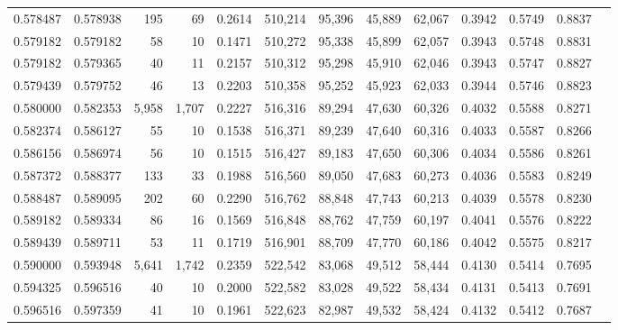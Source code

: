 \begin{tabular}{rrrrrrrrrrrrr}
0.578487 & 0.578938 &    195 &    69 &                                     0.2614 & 510,214 &  95,396 &  45,889 &  62,067 & 0.3942 & 0.5749 & 0.8837 \\
0.579182 & 0.579182 &     58 &    10 &                                     0.1471 & 510,272 &  95,338 &  45,899 &  62,057 & 0.3943 & 0.5748 & 0.8831 \\
0.579182 & 0.579365 &     40 &    11 &                                     0.2157 & 510,312 &  95,298 &  45,910 &  62,046 & 0.3943 & 0.5747 & 0.8827 \\
0.579439 & 0.579752 &     46 &    13 &                                     0.2203 & 510,358 &  95,252 &  45,923 &  62,033 & 0.3944 & 0.5746 & 0.8823 \\
0.580000 & 0.582353 &  5,958 & 1,707 &                                     0.2227 & 516,316 &  89,294 &  47,630 &  60,326 & 0.4032 & 0.5588 & 0.8271 \\
0.582374 & 0.586127 &     55 &    10 &                                     0.1538 & 516,371 &  89,239 &  47,640 &  60,316 & 0.4033 & 0.5587 & 0.8266 \\
0.586156 & 0.586974 &     56 &    10 &                                     0.1515 & 516,427 &  89,183 &  47,650 &  60,306 & 0.4034 & 0.5586 & 0.8261 \\
0.587372 & 0.588377 &    133 &    33 &                                     0.1988 & 516,560 &  89,050 &  47,683 &  60,273 & 0.4036 & 0.5583 & 0.8249 \\
0.588487 & 0.589095 &    202 &    60 &                                     0.2290 & 516,762 &  88,848 &  47,743 &  60,213 & 0.4039 & 0.5578 & 0.8230 \\
0.589182 & 0.589334 &     86 &    16 &                                     0.1569 & 516,848 &  88,762 &  47,759 &  60,197 & 0.4041 & 0.5576 & 0.8222 \\
0.589439 & 0.589711 &     53 &    11 &                                     0.1719 & 516,901 &  88,709 &  47,770 &  60,186 & 0.4042 & 0.5575 & 0.8217 \\
0.590000 & 0.593948 &  5,641 & 1,742 &                                     0.2359 & 522,542 &  83,068 &  49,512 &  58,444 & 0.4130 & 0.5414 & 0.7695 \\
0.594325 & 0.596516 &     40 &    10 &                                     0.2000 & 522,582 &  83,028 &  49,522 &  58,434 & 0.4131 & 0.5413 & 0.7691 \\
0.596516 & 0.597359 &     41 &    10 &                                     0.1961 & 522,623 &  82,987 &  49,532 &  58,424 & 0.4132 & 0.5412 & 0.7687 \\

\end{tabular}
